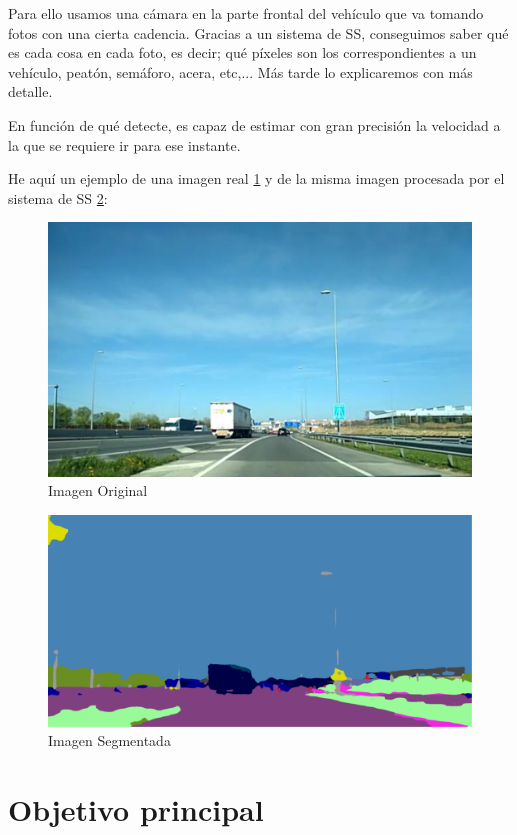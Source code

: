 Para ello usamos una cámara en la parte frontal del vehículo que va tomando fotos con una cierta cadencia. Gracias a un sistema de \ac{SS}, conseguimos saber qué es cada cosa en cada foto, es decir; qué píxeles son los correspondientes a un vehículo, peatón, semáforo, acera, etc,... Más tarde lo explicaremos con más detalle.


En función de qué detecte, es capaz de estimar con gran precisión la velocidad a la que se requiere ir para ese instante.


He aquí un ejemplo de una imagen real \ref{fig:ImgOrig} y de la misma imagen procesada por el sistema de \ac{SS} \ref{fig:ImgSegm}:

\begin{figure}[h]
  \centering
  \includegraphics[width=12cm]{Figuras/Imagen_Original.eps}
  \caption{Imagen Original}
  \label{fig:ImgOrig}
\end{figure}

\begin{figure}[h]
  \centering
  \includegraphics[width=12cm]{Figuras/Ejemplo_Imagen_Segmentada.eps}
  \caption{Imagen Segmentada}
    \label{fig:ImgSegm}
\end{figure}


\section{Objetivo principal}


